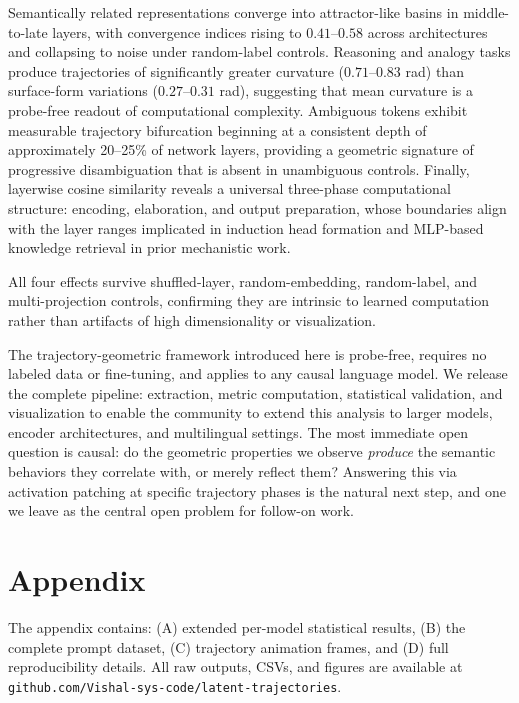 \documentclass{article}
\begin{document}
Semantically related representations converge into attractor-like basins in middle-to-late layers, with convergence indices rising to $0.41$--$0.58$ across architectures and collapsing to noise under random-label controls. Reasoning and analogy tasks produce trajectories of significantly greater curvature ($0.71$--$0.83$ rad) than surface-form variations ($0.27$--$0.31$ rad), suggesting that mean curvature is a probe-free readout of computational complexity. Ambiguous tokens exhibit measurable trajectory bifurcation beginning at a consistent depth of approximately 20--25\% of network layers, providing a geometric signature of progressive disambiguation that is absent in unambiguous controls. Finally, layerwise cosine similarity reveals a universal three-phase computational structure: encoding, elaboration, and output preparation, whose boundaries align with the layer ranges implicated in induction head formation and MLP-based knowledge retrieval in prior mechanistic work.

All four effects survive shuffled-layer, random-embedding, random-label, and multi-projection controls, confirming they are intrinsic to learned computation rather than artifacts of high dimensionality or visualization.

The trajectory-geometric framework introduced here is probe-free, requires no labeled data or fine-tuning, and applies to any causal language model. We release the complete pipeline: extraction, metric computation, statistical validation, and visualization to enable the community to extend this analysis to larger models, encoder architectures, and multilingual settings. The most immediate open question is causal: do the geometric properties we observe \textit{produce} the semantic behaviors they correlate with, or merely reflect them? Answering this via activation patching at specific trajectory phases is the natural next step, and one we leave as the central open problem for follow-on work.

\nocite{*}
  
  

\section*{Appendix}
\label{sec:appendix}

\noindent The appendix contains: (A) extended per-model statistical results, (B) the complete prompt dataset, (C) trajectory animation frames, and (D) full reproducibility details. All raw outputs, CSVs, and figures are available at \texttt{github.com/Vishal-sys-code/latent-trajectories}.
\end{document}
